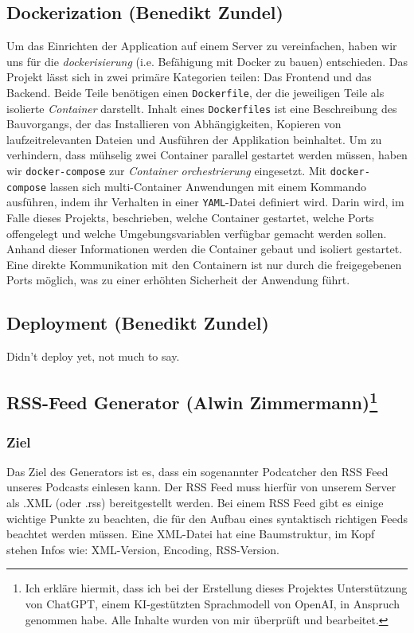 \documentclass{article}
\begin{document}
\subsection{Dockerization \small{(Benedikt Zundel)}}
Um das Einrichten der Application auf einem Server zu vereinfachen, haben wir uns für die \textit{dockerisierung} (i.e. Befähigung mit Docker zu bauen) entschieden. Das Projekt lässt sich in zwei primäre Kategorien teilen: Das Frontend und das Backend. Beide Teile benötigen einen \texttt{Dockerfile}, der die jeweiligen Teile als isolierte \textit{Container} darstellt. Inhalt eines \texttt{Dockerfiles} ist eine Beschreibung des Bauvorgangs, der das Installieren von Abhängigkeiten, Kopieren von laufzeitrelevanten Dateien und Ausführen der Applikation beinhaltet. Um zu verhindern, dass mühselig zwei Container parallel gestartet werden müssen, haben wir \texttt{docker-compose} zur \textit{Container orchestrierung} eingesetzt. Mit \texttt{docker-compose} lassen sich multi-Container Anwendungen mit einem Kommando ausführen, indem ihr Verhalten in einer \texttt{YAML}-Datei definiert wird. Darin wird, im Falle dieses Projekts, beschrieben, welche Container gestartet, welche Ports offengelegt und welche Umgebungsvariablen verfügbar gemacht werden sollen. Anhand dieser Informationen werden die Container gebaut und isoliert gestartet. Eine direkte Kommunikation mit den Containern ist nur durch die freigegebenen Ports möglich, was zu einer erhöhten Sicherheit der Anwendung führt.

\subsection{Deployment \small{(Benedikt Zundel)}}
Didn't deploy yet, not much to say.

\subsection[RSS-Feed Generator \small{(Alwin Zimmermann)}]{RSS-Feed Generator \small{(Alwin Zimmermann)\footnote{Ich erkläre hiermit, dass ich bei der Erstellung dieses Projektes Unterstützung von ChatGPT, einem KI-gestützten Sprachmodell von OpenAI, in Anspruch genommen habe. Alle Inhalte wurden von mir überprüft und bearbeitet.}}}

\subsubsection{Ziel}
Das Ziel des Generators ist es, dass ein sogenannter Podcatcher den RSS Feed unseres Podcasts einlesen kann. Der RSS Feed muss hierfür von unserem Server als .XML (oder .rss) bereitgestellt werden. Bei einem RSS Feed gibt es einige wichtige Punkte zu beachten, die für den Aufbau eines syntaktisch richtigen Feeds beachtet werden müssen. Eine XML-Datei hat eine Baumstruktur, im Kopf stehen Infos wie: XML-Version, Encoding, RSS-Version.
\end{document}
